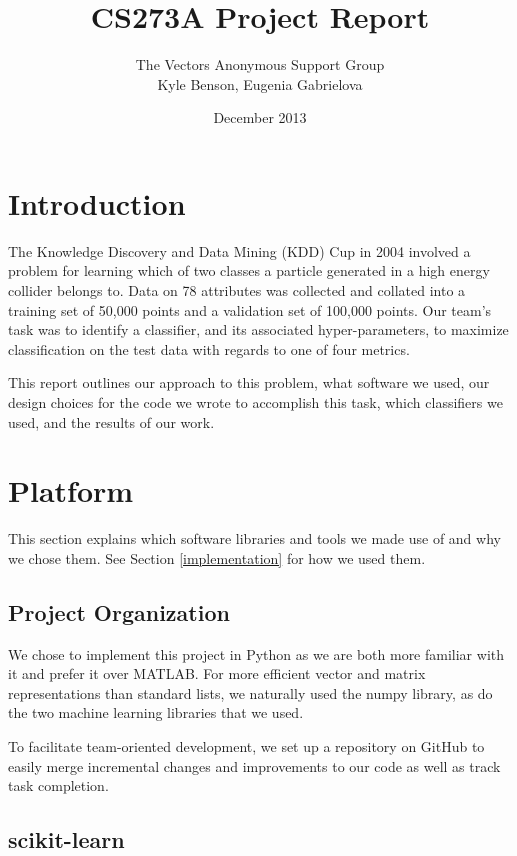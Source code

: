 \documentclass{article}
\title{CS273A Project Report}
\author{The Vectors Anonymous Support Group\\Kyle Benson, Eugenia Gabrielova}
\date{December 2013}
\begin{document}
\maketitle


\section{Introduction}

The Knowledge Discovery and Data Mining (KDD) Cup in 2004 involved a problem for learning which of two classes a particle generated in a high energy collider belongs to.
Data on 78 attributes was collected and collated into a training set of 50,000 points and a validation set of 100,000 points.
Our team's task was to identify a classifier, and its associated hyper-parameters, to maximize classification on the test data with regards to one of four metrics.

This report outlines our approach to this problem, what software we used, our design choices for the code we wrote to accomplish this task, which classifiers we used, and the results of our work.



\section{Platform}

This section explains which software libraries and tools we made use of and why we chose them.
See Section \ref{implementation} for how we used them.

\subsection{Project Organization}
We chose to implement this project in Python as we are both more familiar with it and prefer it over MATLAB\textregistered.
For more efficient vector and matrix representations than standard lists, we naturally used the numpy library, as do the two machine learning libraries that we used.

To facilitate team-oriented development, we set up a repository on GitHub to easily merge incremental changes and improvements to our code as well as track task completion.

\subsection{scikit-learn}
\end{document}
